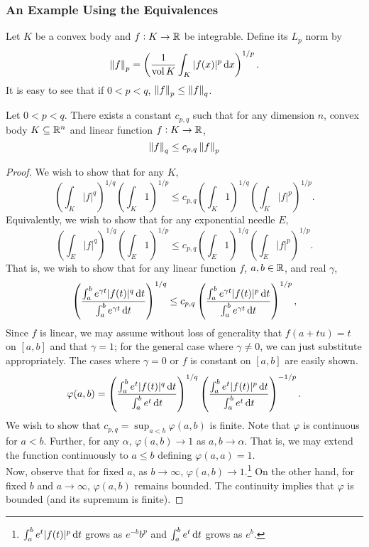 	\subsubsection{An Example Using the Equivalences}

		Let $K$ be a convex body and $f:K\to\mathbb{R}$ be integrable. Define its $L_p$ norm by
		\[ \left\lVert f\right\rVert_p = \left(\frac{1}{\operatorname{vol} K} \int_{K} |f(x)|^p \operatorname{d}\!{x} \right)^{1/p}. \]
		It is easy to see that if $0<p<q$, $\left\lVert f\right\rVert_p \leq \left\lVert f\right\rVert_q$.
		\begin{theorem}
			Let $0<p<q$. There exists a constant $c_{p,q}$ such that for any dimension $n$, convex body $K\subseteq\mathbb{R}^n$ and linear function $f:K\to\mathbb{R}$,
			\[ \left\lVert f\right\rVert_q \leq c_{p,q}\left\lVert f\right\rVert_p \]
		\end{theorem}
		\begin{proof}
			We wish to show that for any $K$,
			\[ \left(\int_K |f|^q\right)^{1/q} \left(\int_K 1\right)^{1/p} \leq c_{p,q} \left(\int_K 1\right)^{1/q} \left(\int_K |f|^p\right)^{1/p}. \]
			Equivalently, we wish to show that for any exponential needle $E$,
			\[ \left(\int_E |f|^q\right)^{1/q} \left(\int_E 1\right)^{1/p} \leq c_{p,q} \left(\int_E 1\right)^{1/q} \left(\int_E |f|^p\right)^{1/p}. \]
			That is, we wish to show that for any linear function $f$, $a,b\in\mathbb{R}$, and real $\gamma$,
			\[ \left( \frac{\int_a^b e^{\gamma t} |f(t)|^q\operatorname{d}\!{t}}{\int_a^b e^{\gamma t}\operatorname{d}\!{t}} \right)^{1/q} \leq c_{p,q} \left( \frac{\int_a^b e^{\gamma t} |f(t)|^p\operatorname{d}\!{t}}{\int_a^b e^{\gamma t}\operatorname{d}\!{t}}\right)^{1/p}, \]
			Since $f$ is linear, we may assume without loss of generality that $f(a+tu)=t$ on $[a,b]$ and that $\gamma=1$; for the general case where $\gamma\neq 0$, we can just substitute appropriately. The cases where $\gamma=0$ or $f$ is constant on $[a,b]$ are easily shown.\\
			\[ \varphi(a,b) = \left( \frac{\int_a^b e^{t} |f(t)|^q\operatorname{d}\!{t}}{\int_a^b e^{t}\operatorname{d}\!{t}} \right)^{1/q} \left( \frac{\int_a^b e^{t} |f(t)|^p\operatorname{d}\!{t}}{\int_a^b e^{t}\operatorname{d}\!{t}} \right)^{-1/p}. \]
			We wish to show that $c_{p,q} = \sup_{a<b} \varphi(a,b)$ is finite. Note that $\varphi$ is continuous for $a<b$. Further, for any $\alpha$, $\varphi(a,b)\to 1$ as $a,b\to\alpha$. That is, we may extend the function continuously to $a\leq b$ defining $\varphi(a,a)=1$.\\
			Now, observe that for fixed $a$, as $b\to\infty$, $\varphi(a,b)\to 1$.\footnote{$\int_a^b e^t |f(t)|^p\operatorname{d}\!{t}$ grows as $e^{-b}b^p$ and $\int_a^b e^t\operatorname{d}\!{t}$ grows as $e^b$.} On the other hand, for fixed $b$ and $a\to\infty$, $\varphi(a,b)$ remains bounded. The continuity implies that $\varphi$ is bounded (and its supremum is finite).
		\end{proof}

